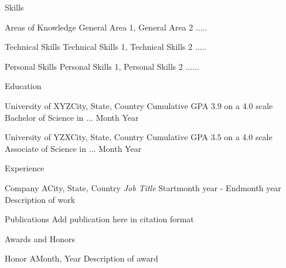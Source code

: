\documentclass{./resume}
\begin{document}
	
	
	\begin{resumesection}{Skills}
		\begin{resumesubsection}{Areas of Knowledge}{}
			General Area 1, General Area 2 .....
		\end{resumesubsection}
		
		\begin{resumesubsection}{Technical Skills}{} 
			Technical Skills 1, Technical Skills 2 .....
		\end{resumesubsection} 
		
		\begin{resumesubsection}{Personal Skills}{}
			Personal Skills 1, Personal Skills 2 ...... 
		\end{resumesubsection}
	\end{resumesection}
	
	\begin{resumesection}{Education}
		\begin{resumesubsection} {University of XYZ}{City, State, Country}     
			Cumulative GPA \hfill 3.9 on a 4.0 scale \newline
			Bachelor of Science in ... \hfill Month Year
		\end{resumesubsection}
		\begin{resumesubsection} {University of YZX}{City, State, Country}     
			Cumulative GPA \hfill 3.5 on a 4.0 scale \newline
			Associate of Science in ... \hfill Month Year
		\end{resumesubsection}
	\end{resumesection}
	
	\begin{resumesection}{Experience}
		\begin{resumesubsection}{Company A}{City, State, Country}
			\textit{Job Title} \normalsize \hfill Startmonth year - Endmonth year \newline
			Description of work
			
			
		\end{resumesubsection}   
		
	\end{resumesection}
	
	\begin{resumesection}{Publications}
		Add publication here in citation format
	\end{resumesection}    
	
	\begin{resumesection}{Awards and Honors}
		
		\begin{resumesubsection}{Honor A}{Month, Year} 
			Description of award
		\end{resumesubsection}
		
	\end{resumesection}  
	
\end{document}
